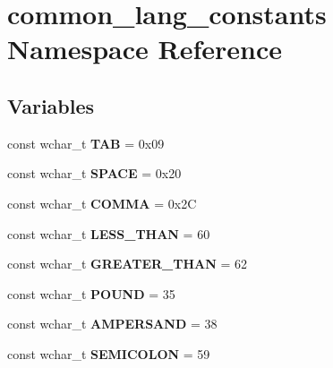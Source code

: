 \hypertarget{namespacecommon__lang__constants}{\section{common\-\_\-lang\-\_\-constants Namespace Reference}
\label{namespacecommon__lang__constants}
}
\subsection*{Variables}
\begin{DoxyCompactItemize}
\item 
\hypertarget{group___indexing_gaf1567d953c44dcd03a14f43827477be8}{const wchar\-\_\-t {\bfseries T\-A\-B} = 0x09}\label{group___indexing_gaf1567d953c44dcd03a14f43827477be8}

\item 
\hypertarget{group___indexing_ga47139b6aa42cfef8c2adf07c47659017}{const wchar\-\_\-t {\bfseries S\-P\-A\-C\-E} = 0x20}\label{group___indexing_ga47139b6aa42cfef8c2adf07c47659017}

\item 
\hypertarget{group___indexing_gaefa1fb1db54f9abd12e543e39caf6aaa}{const wchar\-\_\-t {\bfseries C\-O\-M\-M\-A} = 0x2\-C}\label{group___indexing_gaefa1fb1db54f9abd12e543e39caf6aaa}

\item 
\hypertarget{group___indexing_gadbbafdd578a275153afd758397e18989}{const wchar\-\_\-t {\bfseries L\-E\-S\-S\-\_\-\-T\-H\-A\-N} = 60}\label{group___indexing_gadbbafdd578a275153afd758397e18989}

\item 
\hypertarget{group___indexing_ga4d90459a552ad55c759c9bffeea4fb34}{const wchar\-\_\-t {\bfseries G\-R\-E\-A\-T\-E\-R\-\_\-\-T\-H\-A\-N} = 62}\label{group___indexing_ga4d90459a552ad55c759c9bffeea4fb34}

\item 
\hypertarget{group___indexing_ga463d10992480f4ab48b25f495a4337f1}{const wchar\-\_\-t {\bfseries P\-O\-U\-N\-D} = 35}\label{group___indexing_ga463d10992480f4ab48b25f495a4337f1}

\item 
\hypertarget{group___indexing_ga15d395567241eb3f1cb9ec43c1e71206}{const wchar\-\_\-t {\bfseries A\-M\-P\-E\-R\-S\-A\-N\-D} = 38}\label{group___indexing_ga15d395567241eb3f1cb9ec43c1e71206}

\item 
\hypertarget{group___indexing_ga6f0f90eab6efe0fb5aded20a9e4b3949}{const wchar\-\_\-t {\bfseries S\-E\-M\-I\-C\-O\-L\-O\-N} = 59}\label{group___indexing_ga6f0f90eab6efe0fb5aded20a9e4b3949}


\end{DoxyCompactItemize}
